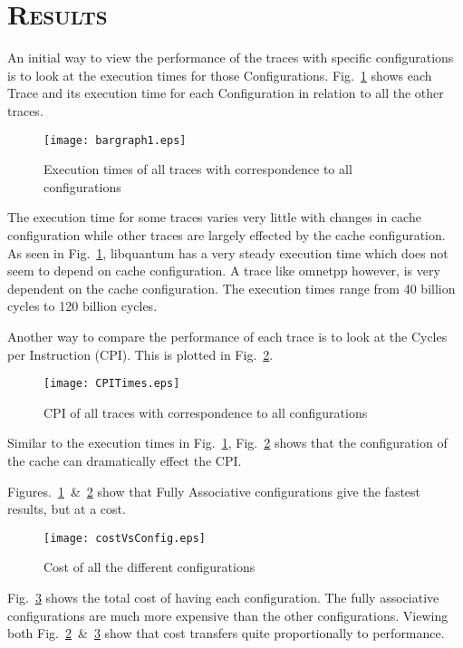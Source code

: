 \documentclass[FinalReport.tex]{subfiles}
\begin{document}
\section*{\textsc{\Large Results}}

An initial way to view the performance of the traces with specific configurations is to look at the execution times for those Configurations.  Fig.~\ref{fig:executiontimes} shows each Trace and its execution time for each Configuration in relation to all the other traces.
\begin{figure}[H]
\centering
\texttt{[image: bargraph1.eps]}
\caption{Execution times of all traces with correspondence to all configurations\label{fig:executiontimes}}
\end{figure}
The execution time for some traces varies very little with changes in cache configuration while other traces are largely effected by the cache configuration.  As seen in Fig.~\ref{fig:executiontimes}, {libquantum} has a very steady execution time which does not seem to depend on cache configuration.  A trace like {omnetpp} however, is very dependent on the cache configuration.  The execution times range from 40 billion cycles to 120 billion cycles. 

Another way to compare the performance of each trace is to look at the Cycles per Instruction (CPI).  This is plotted in Fig.~\ref{fig:CPI}.
\begin{figure}[H]
\centering
\texttt{[image: CPITimes.eps]}
\caption{CPI of all traces with correspondence to all configurations\label{fig:CPI}}
\end{figure}

Similar to the execution times in Fig.~\ref{fig:executiontimes}, Fig.~\ref{fig:CPI} shows that the configuration of the cache can dramatically effect the CPI. 

Figures.~\ref{fig:executiontimes}~\&~\ref{fig:CPI} show that Fully Associative configurations give the fastest results, but at a cost.
\begin{figure}[H]
\centering
\texttt{[image: costVsConfig.eps]}
\caption{Cost of all the different configurations\label{fig:costVsConfig}}
\end{figure}
Fig.~\ref{fig:costVsConfig} shows the total cost of having each configuration.  The fully associative configurations are much more expensive than the other configurations.  Viewing both Fig.~\ref{fig:CPI}~\&~\ref{fig:costVsConfig} show that cost transfers quite proportionally to performance.  





\end{document}
